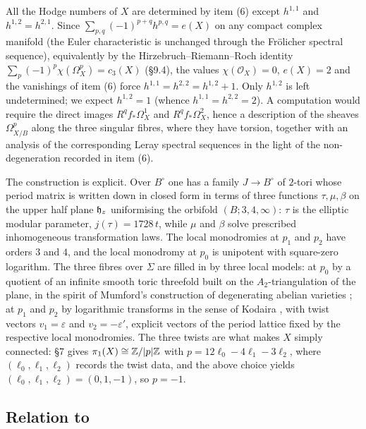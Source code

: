 \begin{remark}
All the Hodge numbers of $X$ are determined by item (6) except $h^{1,1}$ and $h^{1,2} = h^{2,1}$. Since $\sum_{p,q} (-1)^{p+q} h^{p,q} = e(X)$ on any compact complex manifold (the Euler characteristic is unchanged through the Fr\"olicher spectral sequence), equivalently by the Hirzebruch--Riemann--Roch identity $\sum_p (-1)^p \chi(\Omega^p_X) = c_3(X)$ (\S9.4), the values $\chi(\mathcal O_X) = 0$, $e(X) = 2$ and the vanishings of item (6) force $h^{1,1} = h^{2,2} = h^{1,2}+1$. Only $h^{1,2}$ is left undetermined; we expect $h^{1,2} = 1$ (whence $h^{1,1} = h^{2,2} = 2$). A computation would require the direct images $R^q f_*\Omega^1_X$ and $R^q f_*\Omega^2_X$, hence a description of the sheaves $\Omega^p_{X/B}$ along the three singular fibres, where they have torsion, together with an analysis of the corresponding Leray spectral sequences in the light of the non-degeneration recorded in item (6).

The construction is explicit. Over $B^\circ$ one has a family $J \to B^\circ$ of $2$-tori whose period matrix is written down in closed form in terms of three functions $\tau, \mu, \beta$ on the upper half plane $\mathfrak{h}_z$ uniformising the orbifold $(B;3,4,\infty)$: $\tau$ is the elliptic modular parameter, $j(\tau) = 1728\,t$, while $\mu$ and $\beta$ solve prescribed inhomogeneous transformation laws. The local monodromies at $p_1$ and $p_2$ have orders $3$ and $4$, and the local monodromy at $p_0$ is unipotent with square-zero logarithm. The three fibres over $\Sigma$ are filled in by three local models: at $p_0$ by a quotient of an infinite smooth toric threefold built on the $A_2$-triangulation of the plane, in the spirit of Mumford's construction of degenerating abelian varieties \cite{Mum72,AMRT,KKMS}; at $p_1$ and $p_2$ by logarithmic transforms in the sense of Kodaira \cite{Kod64}, with twist vectors $v_1 = \varepsilon$ and $v_2 = -\varepsilon'$, explicit vectors of the period lattice fixed by the respective local monodromies. The three twists are what makes $X$ simply connected: \S7 gives $\pi_1(X) \cong \mathbb{Z}/|p|\mathbb{Z}$ with $p = 12\ell_0 - 4\ell_1 - 3\ell_2$, where $(\ell_0,\ell_1,\ell_2)$ records the twist data, and the above choice yields $(\ell_0,\ell_1,\ell_2) = (0,1,-1)$, so $p = -1$.
\end{remark}

\subsection{Relation to \cite{CDP20}}

